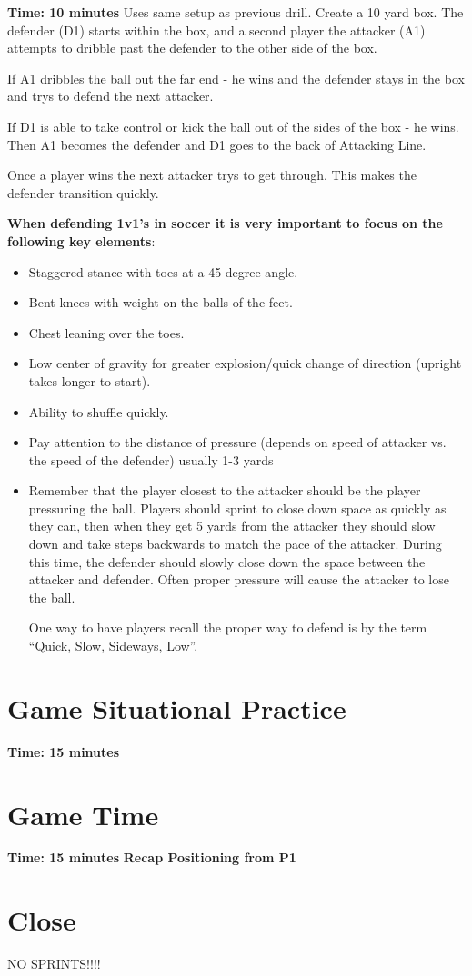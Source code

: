 \documentclass[10pt,letterpaper]{article}
\newenvironment{evenBlock}[1]{%
    \tcolorbox[beamer,%
    noparskip,breakable,
    colback=LightGreen,colframe=DarkGreen,%
    colbacklower=LimeGreen!75!LightGreen,%
    title=#1]}%
    {\endtcolorbox}
\newenvironment{oddBlock}[1]{%
    \tcolorbox[beamer,%
    noparskip,breakable,
    colback=LightBlue,colframe=DarkBlue,%
    colbacklower=DarkBlue!75!LightBlue,%
    title=#1]}%
    {\endtcolorbox}
\begin{document}
\textbf{Time: 10 minutes} Uses same setup as previous drill.
\begin{evenBlock}{Box Defending}
Create a 10 yard box.  The defender (D1) starts within the box, and a second player the attacker (A1) attempts to dribble past the defender to the other side of the box.

If A1 dribbles the ball out the far end - he wins and the defender stays in the box and trys to defend the next attacker.

If D1 is able to take control or kick the ball out of the sides of the box - he wins.
Then A1 becomes the defender and D1 goes to the back of Attacking Line.

Once a player wins the next attacker trys to get through.  This makes the defender transition quickly.

\textbf{When defending 1v1’s in soccer it is very important to focus on the following key elements}:
\begin{itemize}
\item Staggered stance with toes at a 45 degree angle.
\item Bent knees with weight on the balls of the feet.
\item Chest leaning over the toes.
\item Low center of gravity for greater explosion/quick change of direction (upright takes longer to start).
\item Ability to shuffle quickly.
\item Pay attention to the distance of pressure (depends on speed of attacker vs. the speed of the defender) usually 1-3 yards
\item Remember that the player closest to the attacker should be the player pressuring the ball. Players should sprint to close down space as quickly as they can, then when they get 5 yards from the attacker they should slow down and take steps backwards to match the pace of the attacker. During this time, the defender should slowly close down the space between the attacker and defender. Often proper pressure will cause the attacker to lose the ball.

One way to have players recall the proper way to defend is by the term “Quick, Slow, Sideways, Low”.
\end{itemize}
\end{evenBlock}


%

\section{Game Situational Practice}

\textbf{Time: 15 minutes}


%

\section{Game Time}

\textbf{Time: 15 minutes}
\begin{oddBlock}{Small Sided Game}
    \textbf{Recap Positioning from P1}
\end{oddBlock}

\section{Close}

NO SPRINTS!!!!
\end{document}
